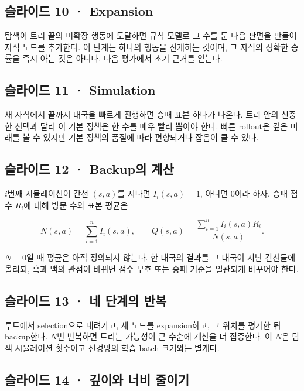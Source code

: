 \documentclass[11pt,a4paper]{article}
\begin{document}
\subsection{슬라이드 10 · Expansion}

탐색이 트리 끝의 미확장 행동에 도달하면 규칙 모델로 그 수를 둔 다음 판면을 만들어 자식 노드를 추가한다. 이 단계는 하나의 행동을 전개하는 것이며, 그 자식의 정확한 승률을 즉시 아는 것은 아니다. 다음 평가에서 초기 근거를 얻는다.\par

\subsection{슬라이드 11 · Simulation}

새 자식에서 끝까지 대국을 빠르게 진행하면 승패 표본 하나가 나온다. 트리 안의 신중한 선택과 달리 이 기본 정책은 한 수를 매우 빨리 뽑아야 한다. 빠른 rollout은 깊은 미래를 볼 수 있지만 기본 정책의 품질에 따라 편향되거나 잡음이 클 수 있다.\par

\subsection{슬라이드 12 · Backup의 계산}

$i$번째 시뮬레이션이 간선 $(s,a)$를 지나면 $I_i(s,a)=1$, 아니면 0이라 하자. 승패 점수 $R_i$에 대해 방문 수와 표본 평균은\par

\[
N(s,a)=\sum_{i=1}^{n}I_i(s,a),\qquad
Q(s,a)=\frac{\sum_{i=1}^{n}I_i(s,a)R_i}{N(s,a)}.
\]

$N=0$일 때 평균은 아직 정의되지 않는다. 한 대국의 결과를 그 대국이 지난 간선들에 올리되, 흑과 백의 관점이 바뀌면 점수 부호 또는 승패 기준을 일관되게 바꾸어야 한다.\par

\subsection{슬라이드 13 · 네 단계의 반복}

루트에서 selection으로 내려가고, 새 노드를 expansion하고, 그 위치를 평가한 뒤 backup한다. $N$번 반복하면 트리는 가능성이 큰 수순에 계산을 더 집중한다. 이 $N$은 탐색 시뮬레이션 횟수이고 신경망의 학습 batch 크기와는 별개다.\par

\subsection{슬라이드 14 · 깊이와 너비 줄이기}
\end{document}
